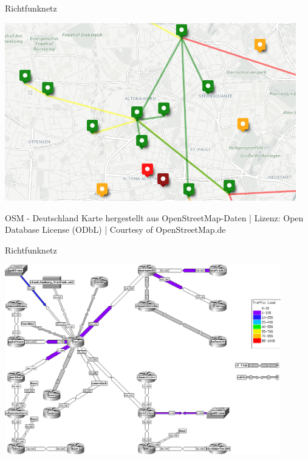 \documentclass[t]{beamer}
\begin{document}
  \begin{frame}{Richtfunknetz}
    \begin{center}
      \includegraphics[width=0.95\textwidth]{Bilder/richtfunk-uebersicht}
    \end{center}
    \tiny{OSM - Deutschland Karte hergestellt aus OpenStreetMap-Daten | Lizenz: Open Database License (ODbL) | Courtesy of OpenStreetMap.de}
  \end{frame}

\begin{frame}{Richtfunknetz}
  \begin{center}
    \includegraphics[width=0.9\textwidth]{Bilder/richtfunk}
  \end{center}
\end{frame}
\end{document}
